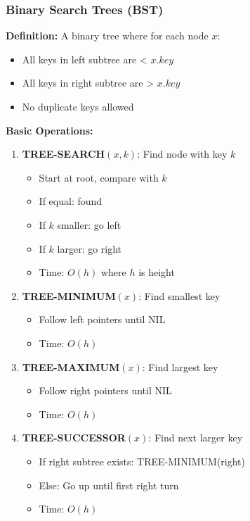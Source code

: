 \FloatBarrier

\subsubsection{Binary Search Trees (BST)}
\textbf{Definition:} A binary tree where for each node $x$:
\begin{itemize}[noitemsep,leftmargin=*]
    \item All keys in left subtree are < $x.key$
    \item All keys in right subtree are > $x.key$
    \item No duplicate keys allowed
\end{itemize}

\textbf{Basic Operations:}
\begin{enumerate}[noitemsep,leftmargin=*]
    \item \textbf{TREE-SEARCH$(x,k)$}: Find node with key $k$
        \begin{itemize}[noitemsep,topsep=0pt]
            \item Start at root, compare with $k$
            \item If equal: found
            \item If $k$ smaller: go left
            \item If $k$ larger: go right
            \item Time: $O(h)$ where $h$ is height
        \end{itemize}
    
    \item \textbf{TREE-MINIMUM$(x)$}: Find smallest key
        \begin{itemize}[noitemsep,topsep=0pt]
            \item Follow left pointers until NIL
            \item Time: $O(h)$
        \end{itemize}
    
    \item \textbf{TREE-MAXIMUM$(x)$}: Find largest key
        \begin{itemize}[noitemsep,topsep=0pt]
            \item Follow right pointers until NIL
            \item Time: $O(h)$
        \end{itemize}
    
    \item \textbf{TREE-SUCCESSOR$(x)$}: Find next larger key
        \begin{itemize}[noitemsep,topsep=0pt]
            \item If right subtree exists: TREE-MINIMUM(right)
            \item Else: Go up until first right turn
            \item Time: $O(h)$
        \end{itemize}
    

\end{enumerate}
